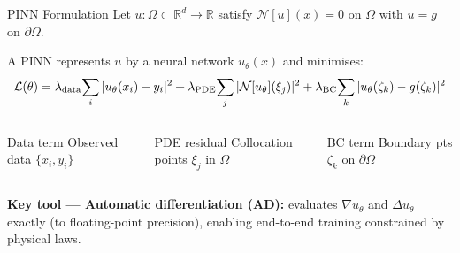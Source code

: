 \documentclass[aspectratio=169,10pt]{beamer}
\begin{document}
\begin{frame}{PINN Formulation}
  Let $u:\Omega\subset\mathbb{R}^d\to\mathbb{R}$ satisfy
  $\mathcal{N}[u](x)=0$ on $\Omega$ with $u=g$ on $\partial\Omega$.
  \medskip

  A PINN represents $u$ by a neural network $u_\theta(x)$ and minimises:
  \begin{equation*}
    \mathcal{L}(\theta)
    = \lambda_{\rm data}\!\sum_i|u_\theta(x_i)-y_i|^2
    + \lambda_{\rm PDE}\!\sum_j|\mathcal{N}[u_\theta](\xi_j)|^2
    + \lambda_{\rm BC}\!\sum_k|u_\theta(\zeta_k)-g(\zeta_k)|^2
  \end{equation*}

  \begin{columns}[T]
      \begin{block}{Data term}
        Observed data $\{x_i,y_i\}$
      \end{block}
      \begin{block}{PDE residual}
        Collocation points $\xi_j$ in $\Omega$
      \end{block}
      \begin{block}{BC term}
        Boundary pts $\zeta_k$ on $\partial\Omega$
      \end{block}
  \end{columns}

  \vspace{0.4cm}
  \textbf{Key tool — Automatic differentiation (AD):} evaluates
  $\nabla u_\theta$ and $\Delta u_\theta$ exactly (to floating-point
  precision), enabling end-to-end training constrained by physical laws.
\end{frame}
\end{document}
